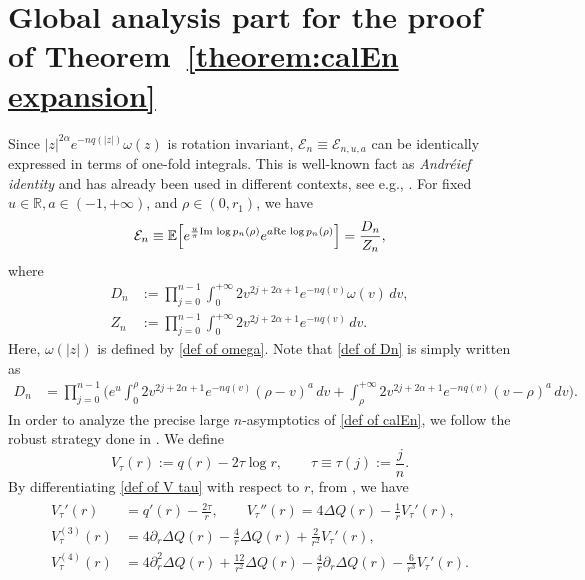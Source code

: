\documentclass[reqno]{amsart}
\newcommand{\1}{\mathds{1}}
\newcommand{\R}{\mathds{R}}
\newcommand{\re}{\text{\upshape Re\,}}
\newcommand{\im}{\text{\upshape Im\,}}
\numberwithin{equation}{section}
\theoremstyle{definition}
\begin{document}
\section{Global analysis part for the proof of Theorem~\ref{theorem:calEn expansion}}
\label{section:global analysis}
Since $|z|^{2\alpha}e^{-nq(|z|)}\omega(z)$ is rotation invariant, $\mathcal{E}_{n}\equiv\mathcal{E}_{n,u,a}$ can be identically expressed in terms of one-fold integrals.
This is well-known fact as {\it Andr\'{e}ief identity} and has already been used in different contexts, see e.g., \cite{BC2022,BKS2023,ACC2023c,ACCL1,ACCL2,ACM2024,BP24,C2021 FH}.
For fixed $u\in\R,a\in(-1,+\infty)$, and $\rho\in(0,r_1)$, we have  
\begin{equation}
\label{def of calEn}
  \mathcal{E}_{n}\equiv\mathbb{E}\Bigl[e^{\frac{u}{\pi}\im\log p_n(\rho)}e^{a\re \log p_n(\rho)}\Bigr]
  =\frac{D_n}{Z_{n}},
\end{equation}
    where 
\begin{align}
\label{def of Dn}
    D_n&:=\prod_{j=0}^{n-1} \int_0^{+\infty} 2v^{2j+2\alpha+1}e^{-nq(v)}\omega(v)\,dv,
    \\
    \nonumber
    Z_{n}&:=\prod_{j=0}^{n-1} \int_0^{+\infty} 2v^{2j+2\alpha+1}e^{-nq(v)}\,dv.
\end{align}
Here, $\omega(|z|)$ is defined by \eqref{def of omega}.
Note that \eqref{def of Dn} is simply written as 
\begin{align*}
    D_n&=
    \prod_{j=0}^{n-1}
    \bigg( 
e^{u}\int_0^{\rho} 2v^{2j+2\alpha+1}e^{-nq(v)}(\rho-v)^{a}\,dv
+
\int_{\rho}^{+\infty} 2v^{2j+2\alpha+1}e^{-nq(v)}(v-\rho)^{a}\,dv
    \bigg). 
\end{align*}
In order to analyze the precise large $n$-asymptotics of \eqref{def of calEn}, we follow the robust strategy done in \cite{ACC2023c,BC2022,BKS2023}. 
We define 
\begin{equation}
\label{def of V tau}
    V_{\tau}(r):=q(r)-2\tau\log r, \qquad \tau\equiv \tau(j):=\frac{j}{n}. 
\end{equation}
By differentiating \eqref{def of V tau} with respect to $r$, from \cite[Eq. (2.4)]{BKS2023}, we have 
\begin{align}
\begin{split}
\label{def of V tau relationship 1}
V_{\tau}'(r)&=q'(r)-\frac{2\tau}{r},\qquad V_{\tau}''(r)=4\Delta Q(r)-\frac{1}{r}V_{\tau}'(r), \\ 
V_{\tau}^{(3)}(r)&=4\partial_{r}\Delta Q(r)-\frac{4}{r}\Delta Q(r)+\frac{2}{r^2}V_{\tau}'(r), \\
V_{\tau}^{(4)}(r)&=4\partial_r^2\Delta Q(r)+\frac{12}{r^2}\Delta Q(r)-\frac{4}{r}\partial_{r}\Delta Q(r)-\frac{6}{r^3}V_{\tau}'(r). 
\end{split}
\end{align}
\end{document}
